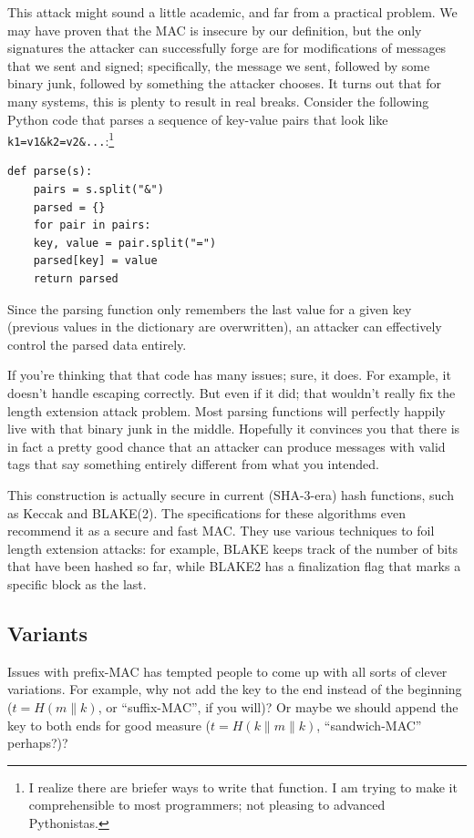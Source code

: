 \documentclass[11pt,ebook,table,dvipsnames]{memoir}
\begin{document}
This attack might sound a little academic, and far from a practical
problem. We may have proven that the MAC is insecure by our
definition, but the only signatures the attacker can successfully
forge are for modifications of messages that we sent and signed;
specifically, the message we sent, followed by some binary junk,
followed by something the attacker chooses. It turns out that for many
systems, this is plenty to result in real breaks. Consider the
following Python code that parses a sequence of key-value pairs that
look like \verb~k1=v1&k2=v2&...~:\footnote{I realize there are briefer ways to
write that function. I am trying to make it comprehensible to most
programmers; not pleasing to advanced Pythonistas.}

\begin{verbatim}
def parse(s):
    pairs = s.split("&")
    parsed = {}
    for pair in pairs:
	key, value = pair.split("=")
	parsed[key] = value
    return parsed
\end{verbatim}

Since the parsing function only remembers the last value for a given
key (previous values in the dictionary are overwritten), an attacker
can effectively control the parsed data entirely.

If you're thinking that that code has many issues; sure, it does. For
example, it doesn't handle escaping correctly. But even if it did;
that wouldn't really fix the length extension attack problem. Most
parsing functions will perfectly happily live with that binary junk in
the middle. Hopefully it convinces you that there is in fact a pretty
good chance that an attacker can produce messages with valid tags that
say something entirely different from what you intended.

This construction is actually secure in current (SHA-3-era) hash
functions, such as Keccak and BLAKE(2). The specifications for these
algorithms even recommend it as a secure and fast MAC. They use
various techniques to foil length extension attacks: for example,
BLAKE keeps track of the number of bits that have been hashed so far,
while BLAKE2 has a finalization flag that marks a specific block as
the last.
\subsection{Variants}
\label{sec-2-7-3-2}

Issues with prefix-MAC has tempted people to come up with all sorts of
clever variations. For example, why not add the key to the end instead
of the beginning ($t = H(m \| k)$, or \enquote{suffix-MAC}, if you will)? Or
maybe we should append the key to both ends for good measure ($t = H(k
\| m \| k)$, \enquote{sandwich-MAC} perhaps?)?
\end{document}
